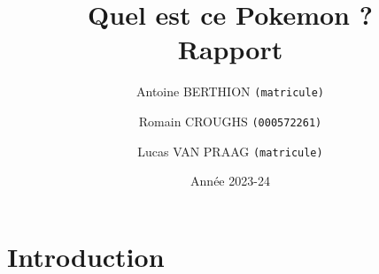 \documentclass{article}
\title{Quel est ce Pokemon ? \\ Rapport}
\date{Année 2023-24}
\author{Antoine BERTHION \texttt{(matricule)} \and Romain CROUGHS \texttt{(000572261)} \and Lucas VAN PRAAG \texttt{(matricule)}}
\begin{document}
\maketitle

\section{Introduction}
\end{document}
